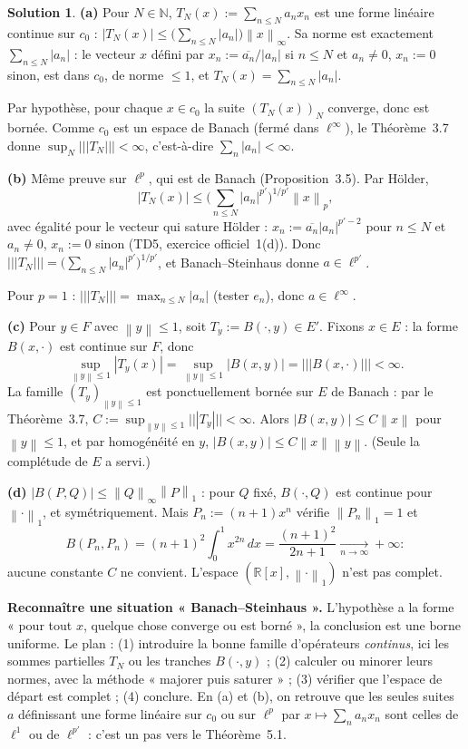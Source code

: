 \documentclass[11pt,a4paper]{article}
\newcommand{\R}{\mathbb{R}}
\newcommand{\N}{\mathbb{N}}
\newcommand{\norm}[1]{\left\|#1\right\|}
\newcommand{\opnorm}[1]{|\!|\!|#1|\!|\!|}
\theoremstyle{definition}
\newtheorem*{solution}{Solution}
\begin{document}
\begin{solution}
\noindent\textbf{(a)} Pour $N\in\N$, $T_N(x):=\sum_{n\le N}a_nx_n$ est une forme linéaire continue sur $c_0$ : $|T_N(x)|\le\big(\sum_{n\le N}|a_n|\big)\norm x_\infty$. Sa norme est exactement $\sum_{n\le N}|a_n|$ : le vecteur $x$ défini par $x_n:=\overline{a_n}/|a_n|$ si $n\le N$ et $a_n\ne0$, $x_n:=0$ sinon, est dans $c_0$, de norme $\le1$, et $T_N(x)=\sum_{n\le N}|a_n|$.

Par hypothèse, pour chaque $x\in c_0$ la suite $(T_N(x))_N$ converge, donc est bornée. Comme $c_0$ est un espace de Banach (fermé dans $\ell^\infty$), le Théorème~3.7 donne $\sup_N\opnorm{T_N}<\infty$, c'est-à-dire $\sum_n|a_n|<\infty$.

\medskip
\noindent\textbf{(b)} Même preuve sur $\ell^p$, qui est de Banach (Proposition~3.5). Par Hölder,
\[
|T_N(x)|\le\Big(\sum_{n\le N}|a_n|^{p'}\Big)^{1/p'}\norm x_p,
\]
avec égalité pour le vecteur qui sature Hölder : $x_n:=\overline{a_n}|a_n|^{p'-2}$ pour $n\le N$ et $a_n\ne0$, $x_n:=0$ sinon (TD5, exercice officiel~1(d)). Donc $\opnorm{T_N}=\big(\sum_{n\le N}|a_n|^{p'}\big)^{1/p'}$, et Banach--Steinhaus donne $a\in\ell^{p'}$.

Pour $p=1$ : $\opnorm{T_N}=\max_{n\le N}|a_n|$ (tester $e_n$), donc $a\in\ell^\infty$.

\medskip
\noindent\textbf{(c)} Pour $y\in F$ avec $\norm y\le1$, soit $T_y:=B(\cdot,y)\in E'$. Fixons $x\in E$ : la forme $B(x,\cdot)$ est continue sur $F$, donc
\[
\sup_{\norm y\le1}|T_y(x)|=\sup_{\norm y\le1}|B(x,y)|=\opnorm{B(x,\cdot)}<\infty .
\]
La famille $(T_y)_{\norm y\le1}$ est ponctuellement bornée sur $E$ de Banach : par le Théorème~3.7, $C:=\sup_{\norm y\le1}\opnorm{T_y}<\infty$. Alors $|B(x,y)|\le C\norm x$ pour $\norm y\le1$, et par homogénéité en $y$, $|B(x,y)|\le C\norm x\norm y$. (Seule la complétude de $E$ a servi.)

\medskip
\noindent\textbf{(d)} $|B(P,Q)|\le\norm Q_\infty\norm P_1$ : pour $Q$ fixé, $B(\cdot,Q)$ est continue pour $\norm\cdot_1$, et symétriquement. Mais $P_n:=(n+1)x^n$ vérifie $\norm{P_n}_1=1$ et
\[
B(P_n,P_n)=(n+1)^2\int_0^1x^{2n}\,dx=\frac{(n+1)^2}{2n+1}\xrightarrow[n\to\infty]{}+\infty :
\]
aucune constante $C$ ne convient. L'espace $(\R[x],\norm\cdot_1)$ n'est pas complet.
\end{solution}

\begin{methode}
\textbf{Reconnaître une situation « Banach--Steinhaus ».} L'hypothèse a la forme « pour tout $x$, quelque chose converge ou est borné », la conclusion est une borne uniforme. Le plan : (1) introduire la bonne famille d'opérateurs \emph{continus}, ici les sommes partielles $T_N$ ou les tranches $B(\cdot,y)$ ; (2) calculer ou minorer leurs normes, avec la méthode « majorer puis saturer » ; (3) vérifier que l'espace de départ est complet ; (4) conclure. En (a) et (b), on retrouve que les seules suites $a$ définissant une forme linéaire sur $c_0$ ou sur $\ell^p$ par $x\mapsto\sum_na_nx_n$ sont celles de $\ell^1$ ou de $\ell^{p'}$ : c'est un pas vers le Théorème~5.1.
\end{methode}
\end{document}
